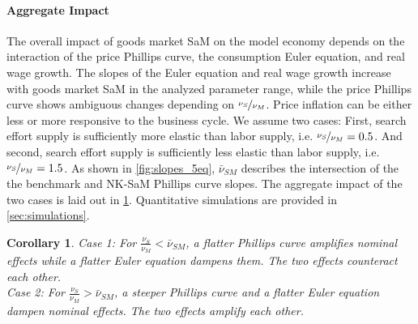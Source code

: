 \documentclass[12pt,3p,authoryear,review]{elsarticle}
\newtheorem{corollary}{Corollary}
\begin{document}
\paragraph{Aggregate Impact}%
The overall impact of goods market SaM on the model economy depends on the interaction of the price Phillips curve, the consumption Euler equation, and real wage growth. The slopes of the Euler equation and real wage growth increase with goods market SaM in the analyzed parameter range, while the price Phillips curve shows ambiguous changes depending on $\nicefrac{\nu_S}{\nu_M}$. Price inflation can be either less or more responsive to the business cycle. We assume two cases: First, search effort supply is sufficiently more elastic than labor supply, i.e. $\nicefrac{\nu_S}{\nu_M} = 0.5$. And second, search effort supply is sufficiently less elastic than labor supply, i.e. $\nicefrac{\nu_S}{\nu_M} = 1.5$. As shown in \cref{fig:slopes_5eq}, $\bar{\nu}_{SM}$ describes the intersection of the the benchmark and NK-SaM Phillips curve slopes. The aggregate impact of the two cases is laid out in \cref{cor:agg_impact_sticky_price}. Quantitative simulations are provided in \cref{sec:simulations}.%
\begin{corollary}\label{cor:agg_impact_sticky_price}%
	Case 1: For $\frac{\nu_S}{\nu_M} < \bar{\nu}_{SM}$, a flatter Phillips curve amplifies nominal effects while a flatter Euler equation dampens them. The two effects counteract each other.\\%
	Case 2: For $\frac{\nu_S}{\nu_M} > \bar{\nu}_{SM}$, a steeper Phillips curve and a flatter Euler equation dampen nominal effects. The two effects amplify each other.%
\end{corollary}%
\end{document}
